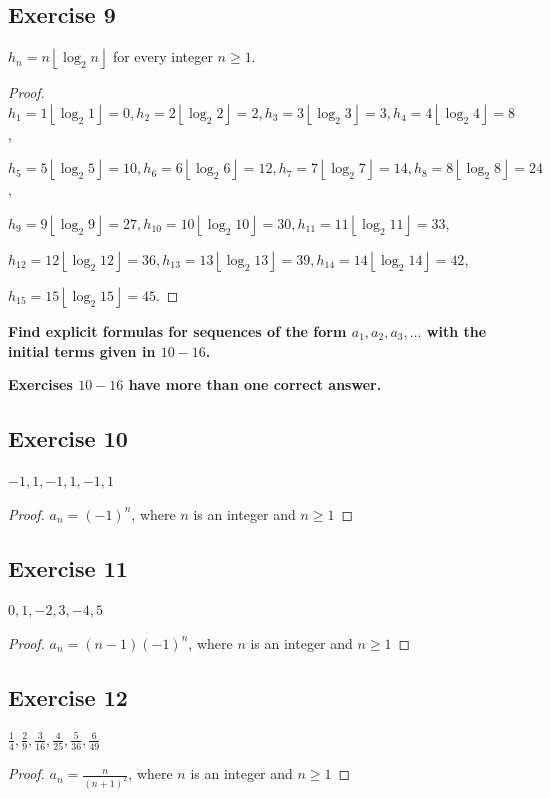 \documentclass[14pt]{extarticle}
\newcommand{\dps}{\displaystyle}
\newcommand{\floor}[1]{{\left\lfloor#1\right\rfloor}}
\newcommand{\cy}{\color{cyan}}
\begin{document}
\subsection{Exercise 9}
$h_n = n\floor{\log_2 n}$ for every integer $n \geq 1$.

\begin{proof}
$h_1 = 1\floor{\log_2 1} = 0, h_2 = 2\floor{\log_2 2} = 2, h_3 = 3\floor{\log_2 3} = 3, h_4 = 4\floor{\log_2 4} = 8$,

$h_5 = 5\floor{\log_2 5} = 10, h_6 = 6\floor{\log_2 6} = 12, h_7 = 7\floor{\log_2 7} = 14, h_8 = 8\floor{\log_2 8} = 24$, 

$h_9 = 9\floor{\log_2 9} = 27, h_{10} = 10\floor{\log_2 10} = 30, h_{11} = 11\floor{\log_2 11} = 33$, 

$h_{12} = 12\floor{\log_2 12} = 36, h_{13} = 13\floor{\log_2 13} = 39, h_{14} = 14\floor{\log_2 14} = 42,$ 

$h_{15} = 15\floor{\log_2 15} = 45$.
\end{proof}

{\bf\cy Find explicit formulas for sequences of the form $a_1, a_2, a_3, \ldots$ with the initial terms given in $10-16$.}

{\bf\cy Exercises $10-16$ have more than one correct answer.}

\subsection{Exercise 10}
$-1, 1, -1, 1, -1, 1$

\begin{proof}
$a_n = (-1)^n$, where $n$ is an integer and $n \geq 1$
\end{proof}

\subsection{Exercise 11}
$0, 1, -2, 3, -4, 5$

\begin{proof}
$a_n = (n-1)(-1)^n$, where $n$ is an integer and $n \geq 1$
\end{proof}

\subsection{Exercise 12}
$\dps \frac{1}{4}, \frac{2}{9}, \frac{3}{16}, \frac{4}{25}, \frac{5}{36}, \frac{6}{49}$

\begin{proof}
$\dps a_n = \frac{n}{(n+1)^2}$, where $n$ is an integer and $n \geq 1$
\end{proof}
\end{document}
